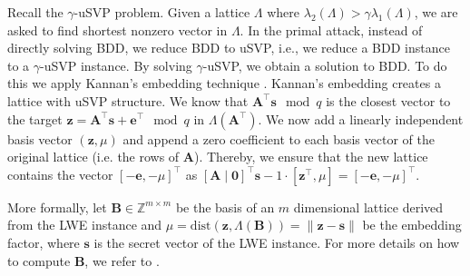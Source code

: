 Recall the $\gamma$-uSVP problem. Given a lattice $\Lambda$ where $\lambda_2(\Lambda) > \gamma \lambda_1(\Lambda)$, we are asked to find shortest nonzero vector in $\Lambda$.
In the primal attack, instead of directly solving BDD, we reduce BDD to uSVP, i.e., we reduce a BDD instance to a $\gamma$-uSVP instance. By solving $\gamma$-uSVP, we obtain a solution to BDD.
To do this we apply Kannan's embedding technique \cite{Kan87}. %
Kannan's embedding creates a lattice with uSVP structure. We know that $\mathbf{A}^\intercal \mathbf{s}\mod q$ is the closest vector to the target $\mathbf{z} =\mathbf{A}^\intercal \mathbf{s} + \mathbf{e}^\intercal \mod q$ in $\Lambda(\mathbf{A}^\intercal)$. We now add a linearly independent basis vector  $(\mathbf{z}, \mu)$ and append a zero coefficient to each basis vector of the original lattice (i.e. the rows of $\mathbf{A}$). Thereby, we ensure that the new lattice contains the vector $[-\mathbf{e}, -\mu]^\intercal$ as $[\mathbf{A} \mid \mathbf{0}]^\intercal \mathbf{s} - 1 \cdot [\mathbf{z}^\intercal, \mu] = [-\mathbf{e}, -\mu]^\intercal$.

More formally, let $\mathbf{B} \in \mathbb{Z}^{m \times m}$ be the basis of an $m$ dimensional lattice derived from the LWE instance and $\mu = \text{dist}(\mathbf{z}, \Lambda(\mathbf{B})) = \| \mathbf{z} - \mathbf{s}\|$ be the embedding factor, where $\mathbf{s}$ is the secret vector of the LWE instance. For more details on how to compute $\mathbf{B}$, we refer to \cite{AFG13}. %

